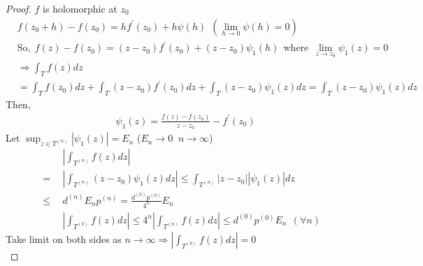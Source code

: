 \begin{proof}
$f$ is holomorphic at $z_0$ 
\begin{equation*}
\begin{split}    
&f(z_0+h)-f(z_0)=hf^{'}(z_0)+h\psi(h) \:\:(\lim_{h \to 0}\psi(h)=0)\\
&\text{So,}\:\: f(z)-f(z_0)=(z-z_0)f^{'}(z_0) + (z-z_0)\psi_1(h)\:\: \text{where}\:\: \lim_{z \to z_0}\psi_1(z)=0
\end{split}
\end{equation*}
\begin{equation*}
\begin{split}    
&\Rightarrow \int_{T}^{} f(z) dz\\
&= \int_{T}^{} f(z_0) dz + \int_{T}^{} (z-z_0)f^{'}(z_0) dz + \int_{T}^{} (z-z_0)\psi_1(z) dz= \int_{T}^{} (z-z_0)\psi_1(z) dz
\end{split}
\end{equation*}
Then, 
\begin{equation*}
\begin{split}
&\psi_1(z)= \frac{f(z)-f(z_0)}{z-z_0}-f^{'}(z_0) 
\end{split}
\end{equation*}
Let  $\sup_{z\in T^{(n)}}|\psi_1(z)|= E_n$ ($E_n\rightarrow 0\:$ \: $n \rightarrow \infty$) 
\begin{equation*}
\begin{split}
&|\int_{T^{(n)}}^{} f(z) dz|\\
=\:\:&|\int_{T^{(n)}}^{} (z-z_0)\psi_1(z) dz|\leq \int_{T^{(n)}}^{} |z-z_0||\psi_1(z)| dz \\
\leq\:\:& d^{(n)}E_np^{(n)}=\frac{d^{(0)}p^{(0)}}{4^n}E_n \\
&|\int_{T^{(0)}}^{} f(z) dz|\leq 4^n|\int_{T^{(n)}}^{} f(z) dz|\leq d^{(0)}p^{(0)}E_n\:\: (\forall n)
\end{split}
\end{equation*}
Take limit on both sides as $n\rightarrow \infty\Rightarrow |\int_{T^{(0)}}^{} f(z) dz|=0$ \\
\end{proof}
